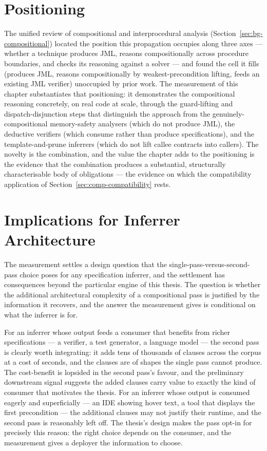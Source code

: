 \section{Positioning}
\label{sec:comp-positioning}

The unified review of compositional and interprocedural analysis
(Section~\ref{sec:bg-compositional}) located the position this propagation
occupies along three axes --- whether a technique produces JML, reasons
compositionally across procedure boundaries, and checks its reasoning against a
solver --- and found the cell it fills (produces JML, reasons compositionally by
weakest-precondition lifting, feeds an existing JML verifier) unoccupied by prior
work. The measurement of this chapter substantiates that positioning: it
demonstrates the compositional reasoning concretely, on real code at scale,
through the guard-lifting and dispatch-disjunction steps that distinguish the
approach from the genuinely-compositional memory-safety analysers (which do not
produce JML), the deductive verifiers (which consume rather than produce
specifications), and the template-and-prune inferrers (which do not lift callee
contracts into callers). The novelty is the combination, and the value the
chapter adds to the positioning is the evidence that the combination produces a
substantial, structurally characterisable body of obligations --- the evidence on
which the compatibility application of Section~\ref{sec:comp-compatibility} rests.

\section{Implications for Inferrer Architecture}
\label{sec:comp-implications}

The measurement settles a design question that the single-pass-versus-second-pass
choice poses for any specification inferrer, and the settlement has consequences
beyond the particular engine of this thesis. The question is whether the
additional architectural complexity of a compositional pass is justified by the
information it recovers, and the answer the measurement gives is conditional on
what the inferrer is for.

For an inferrer whose output feeds a consumer that benefits from richer
specifications --- a verifier, a test generator, a language model --- the second
pass is clearly worth integrating: it adds tens of thousands of clauses across the
corpus at a cost of seconds, and the clauses are of shapes the single pass cannot
produce. The cost-benefit is lopsided in the second pass's favour, and the
preliminary downstream signal suggests the added clauses carry value to exactly
the kind of consumer that motivates the thesis. For an inferrer whose output is
consumed eagerly and superficially --- an IDE showing hover text, a tool that
displays the first precondition --- the additional clauses may not justify their
runtime, and the second pass is reasonably left off. The thesis's design makes the
pass opt-in for precisely this reason: the right choice depends on the consumer,
and the measurement gives a deployer the information to choose.

